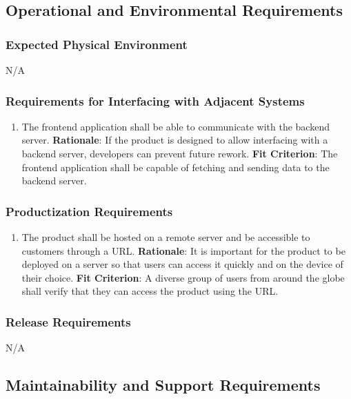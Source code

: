 \documentclass[12pt]{article}
\begin{document}
\subsection{Operational and Environmental Requirements}
\subsubsection{Expected Physical Environment}
N/A

\subsubsection{Requirements for Interfacing with Adjacent Systems}
\begin{enumerate}[nfr]
    \item The frontend application shall be able to communicate with the backend server.
    \newline \textbf{Rationale}: If the product is designed to allow interfacing with a backend server, developers can prevent future rework.
    \newline \textbf{Fit Criterion}: The frontend application shall be capable of fetching and sending data to the backend server.
\end{enumerate}

\subsubsection{Productization Requirements}
\begin{enumerate}[nfr]
    \item The product shall be hosted on a remote server and be accessible to customers through a URL.
    \newline \textbf{Rationale}: It is important for the product to be deployed on a server so that users can access it quickly and on the device of their choice.
    \newline \textbf{Fit Criterion}: A diverse group of users from around the globe shall verify that they can access the product using the URL.
\end{enumerate}

\subsubsection{Release Requirements}
N/A

\subsection{Maintainability and Support Requirements}
\end{document}
